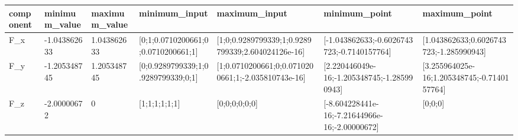 \begin{tabular}{@{}lllllll@{}}
\toprule
component & minimum\_value & maximum\_value & minimum\_input & maximum\_input & minimum\_point & maximum\_point \\
\midrule
F\_x & -1.043862633 & 1.043862633 & [0;1;0.0710200661;0;0.0710200661;1] & [1;0;0.9289799339;1;0.9289799339;2.604024126e-16] & [-1.043862633;-0.6026743723;-0.7140157764] & [1.043862633;0.6026743723;-1.285990943] \\
F\_y & -1.205348745 & 1.205348745 & [0;0.9289799339;1;0.9289799339;0;1] & [1;0.0710200661;0;0.0710200661;1;-2.035810743e-16] & [2.220446049e-16;-1.205348745;-1.285990943] & [3.255964025e-16;1.205348745;-0.7140157764] \\
F\_z & -2.00000672 & 0 & [1;1;1;1;1;1] & [0;0;0;0;0;0] & [-8.604228441e-16;-7.21644966e-16;-2.00000672] & [0;0;0] \\
\bottomrule
\end{tabular}
